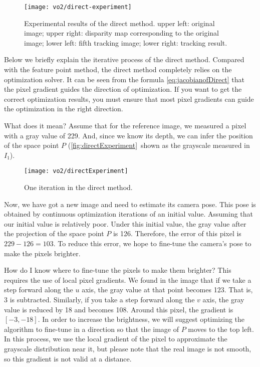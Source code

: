\begin{figure}[!htp]
	\centering
	\texttt{[image: vo2/direct-experiment]}
	\caption{Experimental results of the direct method. upper left: original image; upper right: disparity map corresponding to the original image; lower left: fifth tracking image; lower right: tracking result.}
	\label{fig:direct-experiment}
\end{figure}

Below we briefly explain the iterative process of the direct method. Compared with the feature point method, the direct method completely relies on the optimization solver. It can be seen from the formula \eqref{eq:jacobianofDirect} that the pixel gradient guides the direction of optimization. If you want to get the correct optimization results, you must ensure that most pixel gradients can guide the optimization in the right direction.

What does it mean? Assume that for the reference image, we measured a pixel with a gray value of 229. And, since we know its depth, we can infer the position of the space point $P$ (\autoref{fig:directExperiment}~shown as the grayscale measured in $I_1$).

\begin{figure}[!htp]
	\centering
	\texttt{[image: vo2/directExperiment]}
	\caption{One iteration in the direct method.}
	\label{fig:directExperiment}
\end{figure}

Now, we have got a new image and need to estimate its camera pose. This pose is obtained by continuous optimization iterations of an initial value. Assuming that our initial value is relatively poor. Under this initial value, the gray value after the projection of the space point $P$ is 126. Therefore, the error of this pixel is $229-126=103$. To reduce this error, we hope to fine-tune the camera's pose to make the pixels brighter.

How do I know where to fine-tune the pixels to make them brighter? This requires the use of local pixel gradients. We found in the image that if we take a step forward along the $u$ axis, the gray value at that point becomes 123. That is, 3 is subtracted. Similarly, if you take a step forward along the $v$ axis, the gray value is reduced by 18 and becomes 108. Around this pixel, the gradient is $[-3,-18]$. In order to increase the brightness, we will suggest optimizing the algorithm to fine-tune in a direction so that the image of $P$ moves to the top left. In this process, we use the local gradient of the pixel to approximate the grayscale distribution near it, but please note that the real image is not smooth, so this gradient is not valid at a distance.


